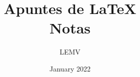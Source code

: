 \documentclass{article}
\title{Apuntes de LaTeX \\
\Large{Notas}}
\author{LEMV}
\date{January 2022}
\begin{document}
\renewcommand*\contentsname{Índice}
\renewcommand{\listtablename}{Índice de Tablas}
\renewcommand{\listfigurename}{Índice de Figuras}

\maketitle\newpage
\tableofcontents\newpage
\listoffigures\newpage
\listoftables\newpage








\newpage\printbibliography[heading=bibintoc, title={Referencias}]

\end{document}
